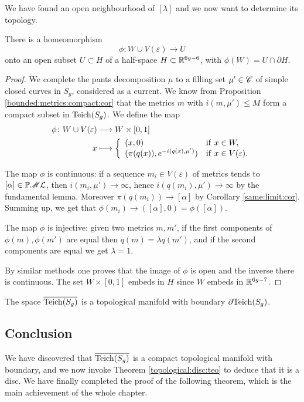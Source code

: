 We have found an open neighbourhood of $[\lambda]$ and we now want to determine its topology. 

\begin{prop}
There is a homeomorphism 
$$\phi\colon W\cup V(\varepsilon) \longrightarrow U $$
onto an open subset $U\subset H$ of a half-space $H\subset \mathbb{R}^{6g-6}$, with $\phi(W) = U\cap \partial H$.
\end{prop}
\begin{proof}
We complete the pants decomposition $\mu$ to a filling set $\mu'\in \mathscr{C}$ of simple closed curves in $S_g$, considered as a current. We know from Proposition \ref{bounded:metrics:compact:cor} that the metrics $m$ with $i(m,\mu')\leqslant M$ form a compact subset in ${\rm Teich}(S_g)$. We define the map
\begin{align*}
\phi \colon W \cup V(\varepsilon) & \longrightarrow W\times [0,1] \\
x & \longmapsto 
\left\{
\begin{array}{ll} (x,0) & {\rm if\ } x\in W, \\
(\pi(q(x)), e^{-i(q(x),\mu')}) & {\rm if\ } x\in V(\varepsilon).
\end{array}
\right.
\end{align*}

The map $\phi$ is continuous: if a sequence $m_i\in V(\varepsilon)$ of metrics tends to $[\alpha]\in\mathbb{P}\mathscr{M}\mathcal{L}$, then $i(m_i,\mu')\to \infty$, hence $i(q(m_i),\mu')\to \infty$ by the fundamental lemma. Moreover $\pi(q(m_i)) \to [\alpha]$ by Corollary \ref{same:limit:cor}. Summing up, we get that $\phi(m_i) \to ([\alpha],0) = \phi([\alpha])$.

The map $\phi$ is injective: given two metrics $m,m'$, if the first components of $\phi(m), \phi(m')$ are equal then $q(m) = \lambda q(m')$, and if the second components are equal we get $\lambda = 1$.

By similar methods one proves that the image of $\phi$ is open and the inverse there is continuous. The set $W\times [0,1]$ embeds in $H$ since $W$ embeds in $\mathbb{R}^{6g-7}$.
\end{proof}

\begin{cor} The space $\overline{{\rm Teich}(S_g)}$ is a topological manifold with boundary $\partial {\rm Teich}(S_g)$.
\end{cor}

\subsection{Conclusion} \label{MCG:conclusion:subsection}
We have discovered that $\overline{{\rm Teich}(S_g)}$ is a compact topological manifold with boundary, and we now invoke Theorem \ref{topological:disc:teo} to deduce that it is a disc. We have finally completed the proof of the following theorem, which is the main achievement of the whole chapter.

